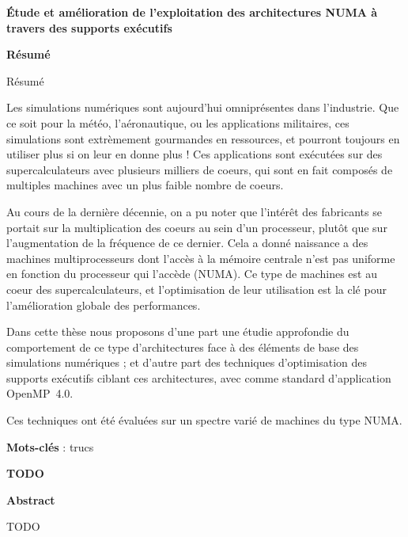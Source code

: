 \MakeUGthesePDG

\clearpage
\ifodd\value{page}\hbox{}\newpage\fi

\begin{center}\textbf{\large Étude et amélioration de l'exploitation des architectures NUMA à travers des supports exécutifs}

\quad

\textbf{Résumé}
\end{center}

Résumé

Les simulations numériques sont aujourd'hui omniprésentes dans l'industrie.
Que ce soit pour la météo, l'aéronautique, ou les applications militaires, ces simulations sont extrèmement gourmandes en ressources, et pourront toujours en utiliser plus si on leur en donne plus !
Ces applications sont exécutées sur des supercalculateurs avec plusieurs milliers de coeurs, qui sont en fait composés de multiples machines avec un plus faible nombre de coeurs.

Au cours de la dernière décennie, on a pu noter que l'intérêt des fabricants se portait sur la multiplication des coeurs au sein d'un processeur, plutôt que sur l'augmentation de la fréquence de ce dernier.
Cela a donné naissance a des machines multiprocesseurs dont l'accès à la mémoire centrale n'est pas uniforme en fonction du processeur qui l'accède (NUMA).
Ce type de machines est au coeur des supercalculateurs, et l'optimisation de leur utilisation est la clé pour l'amélioration globale des performances.

Dans cette thèse nous proposons d'une part une étudie approfondie du comportement de ce type d'architectures face à des éléments de base des simulations numériques ; et d'autre part des techniques d'optimisation des supports exécutifs ciblant ces architectures, avec comme standard d'application OpenMP~4.0.

Ces techniques ont été évaluées sur un spectre varié de machines du type NUMA.



\quad

\textbf{Mots-clés} : trucs

\begin{center}\textbf{\large TODO }

\quad

\textbf{Abstract}
\end{center}

TODO

\quad

